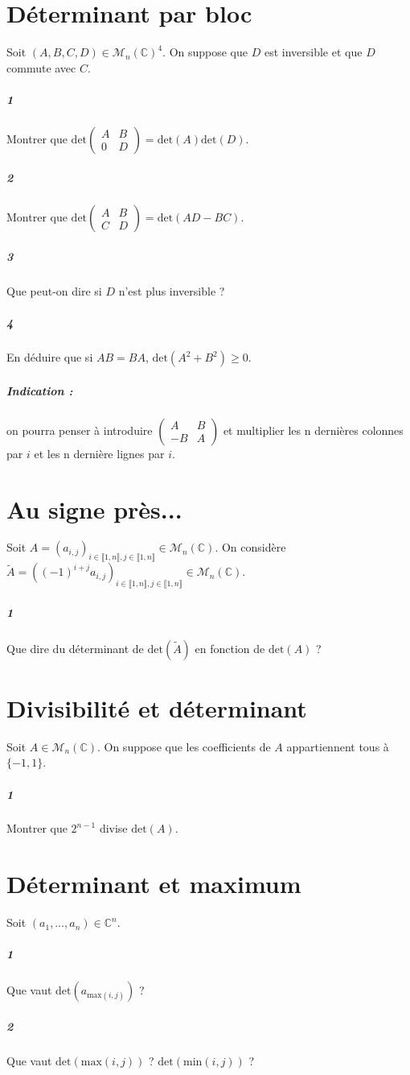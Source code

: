 \documentclass[10pt,a4paper]{article}
\begin{document}
\section{Déterminant par bloc}
Soit $(A,B,C,D) \in \mathcal{M}_n \left( \mathbb{C} \right)^4$. On suppose que $D$ est inversible et que $D$ commute avec $C$.
\subparagraph{1} Montrer que $\text{det} \left( \begin{matrix} A & B \\ 0 & D \end{matrix} \right)= \text{det}(A) \text{det}(D)$.
\subparagraph{2}Montrer que $\text{det} \left( \begin{matrix} A & B \\ C & D \end{matrix} \right)= \text{det}(AD-BC)$.
\subparagraph{3}Que peut-on dire si $D$ n'est plus inversible ?
\subparagraph{4}En déduire que si $AB = BA$, $\text{det}(A^2+B^2) \ge 0$.
\subparagraph{Indication :} on pourra penser à introduire $\left( \begin{matrix}
A & B \\ -B & A
\end{matrix} \right)$ et multiplier les n dernières colonnes par $i$ et les n dernière lignes par $i$.

\section{Au signe près...}
Soit $A = (a_{i,j})_{i \in \llbracket 1,n \rrbracket, j\in \llbracket 1,n \rrbracket} \in \mathcal{M}_n\left( \mathbb{C} \right)$. On considère $\tilde{A} = ((-1)^{i+j}a_{i,j})_{i \in \llbracket 1,n \rrbracket, j\in \llbracket 1,n \rrbracket} \in \mathcal{M}_n\left( \mathbb{C} \right)$.
\subparagraph{1}Que dire du déterminant de $\text{det}(\tilde{A})$ en fonction de $\text{det}(A)$ ?

\section{Divisibilité et déterminant} 
Soit $A \in \mathcal{M}_n \left( \mathbb{C} \right)$. On suppose que les coefficients de $A$ appartiennent tous à $\lbrace -1, 1 \rbrace$.
\subparagraph{1}Montrer que $2^{n-1}$ divise $\text{det}(A)$.

\section{Déterminant et maximum}
Soit $(a_1,\dots,a_n) \in \mathbb{C}^n$. 
\subparagraph{1}Que vaut $\text{det}(a_{\text{max}(i,j)})$ ?
\subparagraph{2}Que vaut $\text{det}(\text{max}(i,j))$ ? $\text{det}(\text{min}(i,j))$ ?
\end{document}
